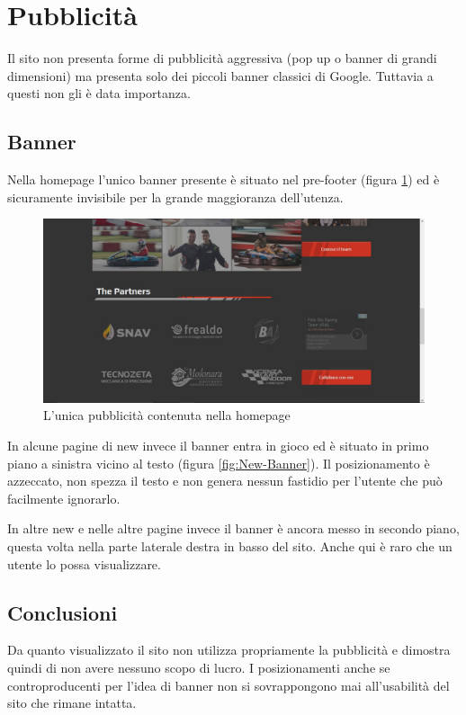 
\section{Pubblicità}
	Il sito non presenta forme di pubblicità aggressiva (pop up o banner di grandi dimensioni) ma presenta solo dei piccoli banner classici di Google. Tuttavia a questi non gli è data importanza.
	
	\subsection{Banner}
	Nella homepage l'unico banner presente è situato nel pre-footer (figura \ref{fig:Homepage-Banner}) ed è sicuramente invisibile per la grande maggioranza dell'utenza.
	
	\begin{figure} [h]
		\includegraphics[width=\textwidth]{images/OpsABanner}
		\caption{L'unica pubblicità contenuta nella homepage}
		\label{fig:Homepage-Banner}
	\end{figure}
	
	In alcune pagine di new invece il banner entra in gioco ed è situato in primo piano a sinistra vicino al testo (figura \ref{fig:New-Banner}). Il posizionamento è azzeccato, non spezza il testo e non genera nessun fastidio per l'utente che può facilmente ignorarlo.
	
	
	In altre new e nelle altre pagine invece il banner è ancora messo in secondo piano, questa volta nella parte laterale destra in basso del sito. Anche qui è raro che un utente lo possa visualizzare.
	
	\subsection{Conclusioni}
		Da quanto visualizzato il sito non utilizza propriamente la pubblicità e dimostra quindi di non avere nessuno scopo di lucro. I posizionamenti anche se controproducenti per l'idea di banner non si sovrappongono mai all'usabilità del sito che rimane intatta.
	
